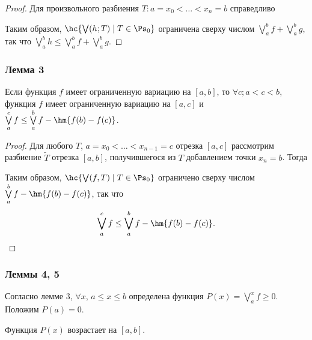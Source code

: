 \documentclass[a4paper]{article}
\begin{document}
\begin{proof}
Для произвольного разбиения $T\colon a=x_0<\dots<x_n=b$ справедливо

Таким образом, $\hc{\bigvee(h;T)\;|\;T\in\Ps_0}$ ограничена сверху
числом $\bigvee\limits_a^b f+\bigvee\limits_a^b g$, так что
$\bigvee\limits_a^b h \le \bigvee\limits_a^b f+\bigvee\limits_a^b
g$.
\end{proof}

\subsubsection{Лемма 3}

\begin{lemma}
Если функция $f$ имеет ограниченную вариацию на $[a,b]$, то $\forall
c; a<c<b$, функция $f$ имеет ограниченную вариацию на $[a,c]$ и
$\bigvee\limits_a^c f \le \bigvee\limits_a^b f - \hm{f(b)-f(c)}$.
\end{lemma}

\begin{proof}
Для любого $T$, $a=x_0<\dots<x_{n-1}=c$ отрезка $[a,c]$ рассмотрим
разбиение $\widetilde T$ отрезка $[a,b]$, получившегося из $T$
добавлением точки $x_n=b$. Тогда 

Таким образом, $\hc{\bigvee(f,T)\;|\;T\in\Ps_0}$ ограничено сверху
числом $\bigvee\limits_a^b f - \hm{f(b)-f(c)}$, так что
$$\bigvee\limits_a^c f \le \bigvee\limits_a^b f - \hm{f(b)-f(c)}.$$
\end{proof}

\subsubsection{Леммы 4, 5}

Согласно лемме 3, $\forall x$, $a\le x\le b$ определена функция
$P(x)=\bigvee\limits_a^x f \ge 0$. Положим $P(a)=0$.

\begin{lemma}
Функция $P(x)$ возрастает на $[a,b]$.
\end{lemma}
\end{document}
